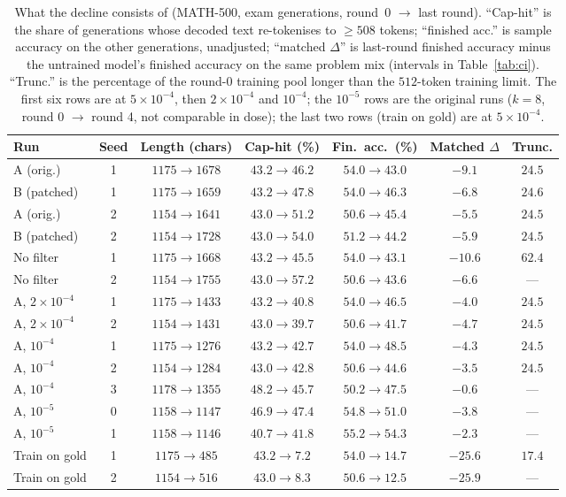 \documentclass[runningheads]{llncs}
\begin{document}
\begin{table}[t]
\caption{What the decline consists of (MATH-500, exam generations, round~0
$\to$ last round). ``Cap-hit'' is the share of generations whose decoded text
re-tokenises to $\ge508$ tokens; ``finished acc.'' is sample accuracy on the
other generations, unadjusted; ``matched $\Delta$'' is last-round finished
accuracy minus the untrained model's finished accuracy on the same problem mix
(intervals in Table~\ref{tab:ci}). ``Trunc.'' is the percentage of the round-0
training pool longer than the $512$-token training limit. The first six rows
are at $5\times10^{-4}$, then $2\times10^{-4}$ and $10^{-4}$; the $10^{-5}$ rows
are the original runs ($k=8$, round 0 $\to$ round 4, not comparable in dose); the
last two rows (train on gold) are at $5\times10^{-4}$.}
\label{tab:anatomy}
\centering
\footnotesize
\setlength{\tabcolsep}{2.5pt}
\begin{tabular}{lcccccc}
\toprule
Run & Seed & Length (chars) & Cap-hit (\%) & Fin.\ acc.\ (\%) & Matched $\Delta$ & Trunc. \\
\midrule
A (orig.)     & 1 & $1175\to1678$ & $43.2\to46.2$ & $54.0\to43.0$ & $-9.1$  & $24.5$ \\
B (patched)   & 1 & $1175\to1659$ & $43.2\to47.8$ & $54.0\to46.3$ & $-6.8$  & $24.6$ \\
A (orig.)     & 2 & $1154\to1641$ & $43.0\to51.2$ & $50.6\to45.4$ & $-5.5$  & $24.5$ \\
B (patched)   & 2 & $1154\to1728$ & $43.0\to54.0$ & $51.2\to44.2$ & $-5.9$  & $24.5$ \\
No filter     & 1 & $1175\to1668$ & $43.2\to45.5$ & $54.0\to43.1$ & $-10.6$ & $62.4$ \\
No filter     & 2 & $1154\to1755$ & $43.0\to57.2$ & $50.6\to43.6$ & $-6.6$  & --- \\
A, $2\times10^{-4}$ & 1 & $1175\to1433$ & $43.2\to40.8$ & $54.0\to46.5$ & $-4.0$ & $24.5$ \\
A, $2\times10^{-4}$ & 2 & $1154\to1431$ & $43.0\to39.7$ & $50.6\to41.7$ & $-4.7$ & $24.5$ \\
A, $10^{-4}$  & 1 & $1175\to1276$ & $43.2\to42.7$ & $54.0\to48.5$ & $-4.3$ & $24.5$ \\
A, $10^{-4}$  & 2 & $1154\to1284$ & $43.0\to42.8$ & $50.6\to44.6$ & $-3.5$ & $24.5$ \\
A, $10^{-4}$  & 3 & $1178\to1355$ & $48.2\to45.7$ & $50.2\to47.5$ & $-0.6$ & --- \\
A, $10^{-5}$  & 0 & $1158\to1147$ & $46.9\to47.4$ & $54.8\to51.0$ & $-3.8$ & --- \\
A, $10^{-5}$  & 1 & $1158\to1146$ & $40.7\to41.8$ & $55.2\to54.3$ & $-2.3$ & --- \\
Train on gold & 1 & $1175\to485$  & $43.2\to7.2$  & $54.0\to14.7$ & $-25.6$ & $17.4$ \\
Train on gold & 2 & $1154\to516$  & $43.0\to8.3$  & $50.6\to12.5$ & $-25.9$ & --- \\
\bottomrule
\end{tabular}
\end{table}
\end{document}
